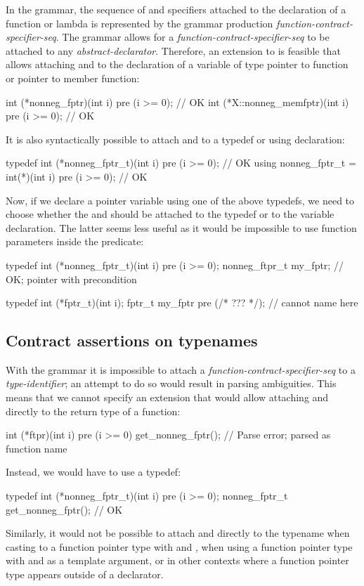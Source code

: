 In the \cite{P2900R8} grammar, the sequence of  and  specifiers attached to the declaration of a function or lambda is represented by the grammar production \emph{function-contract-specifier-seq}. The grammar allows for a \emph{function-contract-specifier-seq} to be attached to any \emph{abstract-declarator}. Therefore, an extension to \cite{P2900R8} is feasible that allows attaching  and  to the declaration of a variable of type pointer to function or pointer to member function:
\begin{codeblock}
int (*nonneg_fptr)(int i) pre (i >= 0);        // OK
int (*X::nonneg_memfptr)(int i) pre (i >= 0);  // OK
\end{codeblock}
It is also syntactically possible to attach  and  to a typedef or using declaration:
\begin{codeblock}
typedef int (*nonneg_fptr_t)(int i) pre (i >= 0);  // OK
using nonneg_fptr_t = int(*)(int i) pre (i >= 0);  // OK
\end{codeblock}
Now, if we declare a pointer variable using one of the above typedefs, we need to choose whether the   and  should be attached to the typedef or to the variable declaration. The latter seems less useful as it would be impossible to use function parameters inside the predicate:
\begin{codeblock}
typedef int (*nonneg_fptr_t)(int i) pre (i >= 0);  
nonneg_ftpr_t my_fptr;  // OK; pointer with precondition

typedef int (*fptr_t)(int i);
fptr_t my_fptr pre (/* ??? */);  // cannot name  here
\end{codeblock}

\subsection{Contract assertions on typenames}

With the \cite{P2900R8} grammar it is impossible to attach a \emph{function-contract-specifier-seq} to a \emph{type-identifier}; an attempt to do so would result in parsing ambiguities. This means that we cannot specify an extension that would allow attaching  and  directly to the return type of a function:
\begin{codeblock}
int (*ftpr)(int i) pre (i >= 0) get_nonneg_fptr();  // Parse error;  parsed as function name
\end{codeblock}
Instead, we would have to use a typedef:
\begin{codeblock}
typedef int (*nonneg_fptr_t)(int i) pre (i >= 0); 
nonneg_fptr_t get_nonneg_fptr();  // OK
\end{codeblock}
Similarly, it would not be possible to attach  and  directly to the typename when casting to a function pointer type with   and , when using a function pointer type with  and  as a template argument, or in other contexts where a function pointer type appears outside of a declarator.

